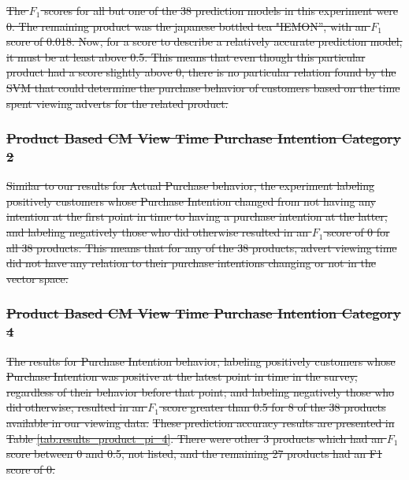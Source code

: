 \documentclass[review]{elsarticle}
\providecommand{\DIFdeltex}[1]{{\protect\color{red}\sout{#1}}}                      %
\providecommand{\DIFdelbegin}{} %
\providecommand{\DIFdelend}{} %
\providecommand{\DIFdel}[1]{\texorpdfstring{\DIFdeltex{#1}}{}} %
\newcommand{\DIFscaledelfig}{0.5}
\newlength{\DIFdelgraphicswidth} %
\newlength{\DIFdelgraphicsheight} %
\newcommand{\DIFdelincludegraphics}[2][]{%
\sbox{\DIFdelgraphicsbox}{\DIFOincludegraphics[#1]{#2}}%
\settoboxwidth{\DIFdelgraphicswidth}{\DIFdelgraphicsbox} %
\settoboxtotalheight{\DIFdelgraphicsheight}{\DIFdelgraphicsbox} %
\scalebox{\DIFscaledelfig}{%
\parbox[b]{\DIFdelgraphicswidth}{\usebox{\DIFdelgraphicsbox}\\[-\baselineskip] \rule{\DIFdelgraphicswidth}{0em}}\llap{\resizebox{\DIFdelgraphicswidth}{\DIFdelgraphicsheight}{%
\setlength{\unitlength}{\DIFdelgraphicswidth}%
\begin{picture}(1,1)%
\thicklines\linethickness{2pt} %
{\color[rgb]{1,0,0}\put(0,0){\framebox(1,1){}}}%
{\color[rgb]{1,0,0}\put(0,0){\line( 1,1){1}}}%
{\color[rgb]{1,0,0}\put(0,1){\line(1,-1){1}}}%
\end{picture}%
}\hspace*{3pt}}} %
} %
\DeclareRobustCommand{\DIFdelbegin}{\DIFOdelbegin \let\includegraphics\DIFdelincludegraphics} %
\DeclareRobustCommand{\DIFdelend}{\DIFOaddend \let\includegraphics\DIFOincludegraphics} %
\begin{document}
\DIFdelbegin \DIFdel{The \(F_{1}\) scores for all but one of the 38 prediction models in this experiment were 0. The remaining product was the japanese bottled tea "IEMON”, with an \(F_{1}\) score of 0.018. Now, for a score to describe a relatively accurate prediction model, it must be at least above 0.5. This means that even though this particular product had a score slightly above 0, there is no particular relation found by the SVM that could determine the purchase behavior of customers based on the time spent viewing adverts for the related product. }\DIFdelend 


\DIFdelbegin \subsubsection{\DIFdel{Product Based CM View Time \textperiodcentered  Purchase Intention Category 2}}
\addtocounter{subsubsection}{-1}%
\DIFdelend

\DIFdelbegin \DIFdel{Similar to our results for Actual Purchase behavior, the experiment labeling positively customers whose Purchase Intention changed from not having any intention at the first point in time to having a purchase intention at the latter, and labeling negatively those who did otherwise resulted in an \(F_{1}\) score of 0 for all 38 products. This means that for any of the 38 products, advert viewing time did not have any relation to their purchase intentions changing or not in the vector space.
}\DIFdelend 

\DIFdelbegin \subsubsection{\DIFdel{Product Based CM View Time \textperiodcentered  Purchase Intention Category 4}}
\addtocounter{subsubsection}{-1}%

\DIFdel{The results for Purchase Intention behavior, labeling positively customers whose Purchase Intention was positive at the latest point in time in the survey, regardless of their behavior before that point; and labeling negatively those who did otherwise, resulted in an \(F_{1}\) score greater than 0.5 for 8 of the 38 products available in our viewing data.}\DIFdelend 
\DIFdelbegin \DIFdel{These prediction accuracy results are presented in Table \ref{tab:results_product_pi_4}. There were other 3 products which had an \(F_{1}\) score between 0 and 0.5, not listed, and the remaining 27 products had an F1 score of 0. 
}\DIFdelend 
\end{document}
